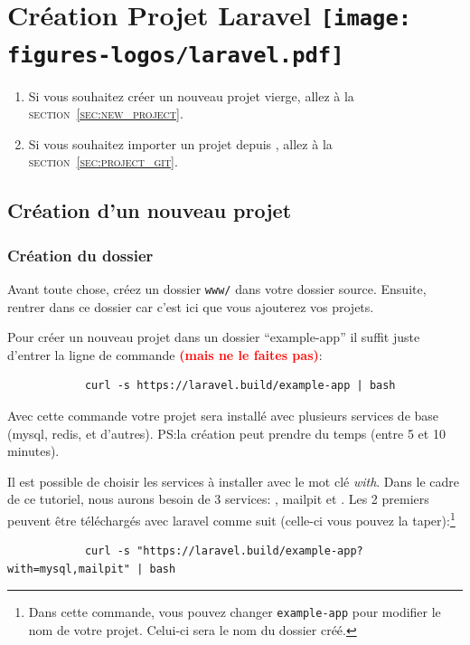 \section[Création Projet Laravel]{Création Projet Laravel \texttt{[image: figures-logos/laravel.pdf]}}

\begin{enumerate}
    \item Si vous souhaitez créer un nouveau projet vierge, allez à la \textsc{section~\ref{sec:new_project}}.
    \item Si vous souhaitez importer un projet depuis \github{}, allez à la \textsc{section~\ref{sec:project_git}}.
\end{enumerate}

\subsection[Création d'un nouveau projet]{Création d'un nouveau projet\label{sec:new_project}}
    \subsubsection[Création du dossier]{Création du dossier}
        Avant toute chose, créez un dossier \verb|www/| dans votre dossier source. Ensuite, rentrer dans ce dossier car c'est ici que vous ajouterez vos projets.
        
        Pour créer un nouveau projet \laravel{} dans un dossier ``example-app'' il suffit juste d'entrer la ligne de commande \textcolor{red}{\textbf{(mais ne le faites pas)}}:

        \begin{lstlisting}
            curl -s https://laravel.build/example-app | bash
        \end{lstlisting}

        Avec cette commande votre projet sera installé avec plusieurs services de base (mysql, redis, et d'autres). PS:la création peut prendre du temps (entre 5 et 10 minutes).

        Il est possible de choisir les services à installer avec le mot clé \textit{with}. Dans le cadre de ce tutoriel, nous aurons besoin de 3 services: \mysql, mailpit et \phpmyadmin. Les 2 premiers peuvent être téléchargés avec laravel comme suit (celle-ci vous pouvez la taper):\footnote{Dans cette commande, vous pouvez changer \verb|example-app| pour modifier le nom de votre projet. Celui-ci sera le nom du dossier créé.}

        \begin{lstlisting}
            curl -s "https://laravel.build/example-app?with=mysql,mailpit" | bash
        \end{lstlisting}

